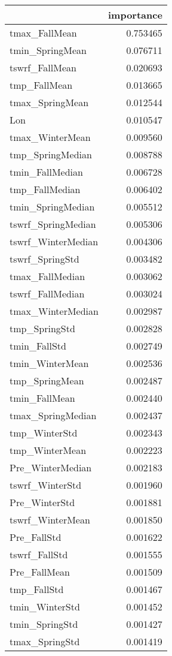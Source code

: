\begin{tabular}{lr}
\toprule
 & importance \\
\midrule
tmax_FallMean & 0.753465 \\
tmin_SpringMean & 0.076711 \\
tswrf_FallMean & 0.020693 \\
tmp_FallMean & 0.013665 \\
tmax_SpringMean & 0.012544 \\
Lon & 0.010547 \\
tmax_WinterMean & 0.009560 \\
tmp_SpringMedian & 0.008788 \\
tmin_FallMedian & 0.006728 \\
tmp_FallMedian & 0.006402 \\
tmin_SpringMedian & 0.005512 \\
tswrf_SpringMedian & 0.005306 \\
tswrf_WinterMedian & 0.004306 \\
tswrf_SpringStd & 0.003482 \\
tmax_FallMedian & 0.003062 \\
tswrf_FallMedian & 0.003024 \\
tmax_WinterMedian & 0.002987 \\
tmp_SpringStd & 0.002828 \\
tmin_FallStd & 0.002749 \\
tmin_WinterMean & 0.002536 \\
tmp_SpringMean & 0.002487 \\
tmin_FallMean & 0.002440 \\
tmax_SpringMedian & 0.002437 \\
tmp_WinterStd & 0.002343 \\
tmp_WinterMean & 0.002223 \\
Pre_WinterMedian & 0.002183 \\
tswrf_WinterStd & 0.001960 \\
Pre_WinterStd & 0.001881 \\
tswrf_WinterMean & 0.001850 \\
Pre_FallStd & 0.001622 \\
tswrf_FallStd & 0.001555 \\
Pre_FallMean & 0.001509 \\
tmp_FallStd & 0.001467 \\
tmin_WinterStd & 0.001452 \\
tmin_SpringStd & 0.001427 \\
tmax_SpringStd & 0.001419 \\

\end{tabular}
